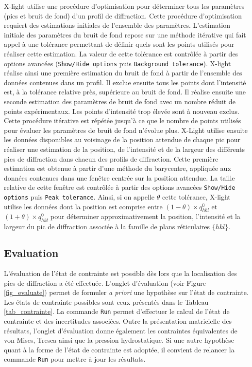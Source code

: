 \documentclass[french,a4paper]{report}
\begin{document}
X-light utilise une procédure d'optimisation pour déterminer tous les paramètres (pics et bruit de fond) d'un profil de diffraction. Cette procédure d'optimisation requiert des estimations initiales de l'ensemble des paramètres. L'estimation initiale des paramètres du bruit de fond repose sur une méthode itérative qui fait appel à une tolérance permettant de définir quels sont les points utilisés pour réaliser cette estimation. La valeur de cette tolérance est contrôlée à partir des options avancées (\texttt{Show/Hide options} puis \texttt{Background tolerance}). X-light réalise ainsi une première estimation du bruit de fond à partir de l'ensemble des données contenues dans un profil. Il exclue ensuite tous les points dont l'intensité est, à la tolérance relative près, supérieure au bruit de fond. Il réalise ensuite une seconde estimation des paramètres de bruit de fond avec un nombre réduit de points expérimentaux. Les points d'intensité trop élevée sont à nouveau exclus. Cette procédure itérative est répétée jusqu'à ce que le nombre de points utilisés pour évaluer les paramètres de bruit de fond n'évolue plus. X-Light utilise ensuite les données disponibles au voisinage de la position attendue de chaque pic pour réaliser une estimation de la position, de l'intensité et de la largeur des différents pics de diffraction dans chacun des profils de diffraction. Cette première estimation est obtenue à partir d'une méthode du barycentre, appliquée aux données contenues dans une fenêtre centrée sur la position attendue. La taille relative de cette fenêtre est contrôlée à partir des options avancées \texttt{Show/Hide options} puis \texttt{Peak tolerance}. Ainsi, si on appelle $\theta$ cette tolérance, X-light utilise les données dont la position est comprise entre $(1-\theta)\times q^0_{hkl}$ et $(1+\theta)\times q^0_{hkl}$ pour déterminer approximativement la position, l'intensité et la largeur du pic de diffraction associée à la famille de plans réticulaires $\{hkl\}$.

\subsection{Evaluation}

L'évaluation de l'état de contrainte est possible dès lors que la localisation des pics de diffraction a été effectuée. L'onglet d'évaluation (voir Figure \ref{fig_evaluate}) permet de formuler \textit{a priori} une hypothèse sur l'état de contrainte. Les états de contrainte possibles sont ceux présentés dans le Tableau \ref{tab_contrainte}. La commande \texttt{Run} permet d'effectuer le calcul de l'état de contrainte et des incertitudes associées. Outre la présentation matricielle des résultats, l'onglet d'évaluation donne également les contraintes équivalentes de von Mises, Tresca ainsi que la pression hydrostatique. Si une autre hypothèse quant à la forme de l'état de contrainte est adoptée, il convient de relancer la commande \texttt{Run} pour mettre à jour les résultats.
\end{document}
